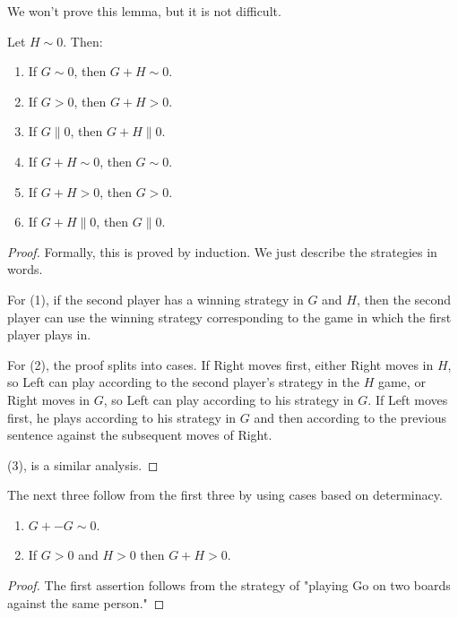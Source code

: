 We won't prove this lemma, but it is not difficult.

\begin{lemma} %
Let $H\sim 0$. Then:
\begin{enumerate}
  \item  If $G\sim 0$, then $G+H\sim 0$.
  \item  If $G>0$, then $G+H>0$.
  \item  If $G\parallel 0$, then $G+H\parallel 0$.
  \item  If $G+H\sim 0$, then $G\sim 0$.
  \item  If $G+H>0$, then $G>0$.
  \item  If $G+H\parallel 0$, then $G\parallel 0$.
\end{enumerate}
 \end{lemma}

\begin{proof} %

Formally, this is proved by induction. We just describe the strategies in words.

For (1), if the second player has a winning strategy in $G$ and $H$, then the second player can use the winning strategy corresponding to the game in which the first player plays in.

For (2), the proof splits into cases. If Right moves first, either Right moves in $H$, so Left can play according to the second player's strategy in the $H$ game, or Right moves in $G$, so Left can play according to his strategy in $G$. If Left moves first, he plays according to his strategy in $G$ and then according to the previous sentence against the subsequent moves of Right.

(3), is a similar analysis.
 \end{proof}

The next three follow from the first three by using cases based on determinacy.

\begin{lemma} %
\begin{enumerate}
  \item  $G+ -G\sim 0$.
  \item  If $G>0$ and $H>0$ then $G+H>0$.
\end{enumerate}
 \end{lemma}

\begin{proof} %

The first assertion follows from the strategy of "playing Go on two boards against the same person."
 \end{proof}


\begin{definition} %
 \end{definition}
